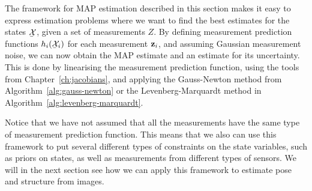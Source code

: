 The framework for MAP estimation described in this section makes it easy to express estimation problems where we want to find the best estimates for the states $\ubar{\cX}$, given a set of measurements $Z$.
By defining measurement prediction functions $h_i(\ubar{\cX}_i)$ for each measurement ${\boldsymbol{\mathbf{z}}}_i$, and assuming Gaussian measurement noise, we can now obtain the MAP estimate and an estimate for its uncertainty.
This is done by linearising the measurement prediction function, using the tools from Chapter~\ref{ch:jacobians}, and applying the Gauss-Newton method from Algorithm~\ref{alg:gauss-newton} or the Levenberg-Marquardt method in Algorithm~\ref{alg:levenberg-marquardt}.

Notice that we have not assumed that all the measurements have the same type of measurement prediction function.
This means that we also can use this framework to put several different types of constraints on the state variables, such as priors on states, as well as measurements from different types of sensors.
We will in the next section see how we can apply this framework to estimate pose and structure from images.

